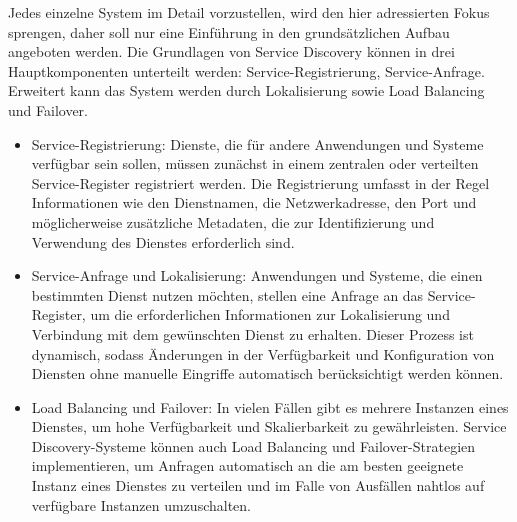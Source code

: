 \documentclass[../vs-script-first-v01.tex]{subfiles}
\begin{document}
Jedes einzelne System im Detail vorzustellen, wird den hier adressierten Fokus sprengen, daher soll nur eine Einführung in den grundsätzlichen Aufbau angeboten werden. 
Die Grundlagen von Service Discovery können in drei Hauptkomponenten unterteilt werden: Service-Registrierung, Service-Anfrage. Erweitert kann das System werden durch Lokalisierung sowie Load Balancing und Failover.
\begin{itemize}
\item Service-Registrierung: Dienste, die für andere Anwendungen und Systeme verfügbar sein sollen, müssen zunächst in einem zentralen oder verteilten Service-Register registriert werden. Die Registrierung umfasst in der Regel Informationen wie den Dienstnamen, die Netzwerkadresse, den Port und möglicherweise zusätzliche Metadaten, die zur Identifizierung und Verwendung des Dienstes erforderlich sind.
\item Service-Anfrage und Lokalisierung: Anwendungen und Systeme, die einen bestimmten Dienst nutzen möchten, stellen eine Anfrage an das Service-Register, um die erforderlichen Informationen zur Lokalisierung und Verbindung mit dem gewünschten Dienst zu erhalten. Dieser Prozess ist dynamisch, sodass Änderungen in der Verfügbarkeit und Konfiguration von Diensten ohne manuelle Eingriffe automatisch berücksichtigt werden können.
\item Load Balancing und Failover: In vielen Fällen gibt es mehrere Instanzen eines Dienstes, um hohe Verfügbarkeit und Skalierbarkeit zu gewährleisten. Service Discovery-Systeme können auch Load Balancing und Failover-Strategien implementieren, um Anfragen automatisch an die am besten geeignete Instanz eines Dienstes zu verteilen und im Falle von Ausfällen nahtlos auf verfügbare Instanzen umzuschalten.
\end{itemize}    
\end{document}
